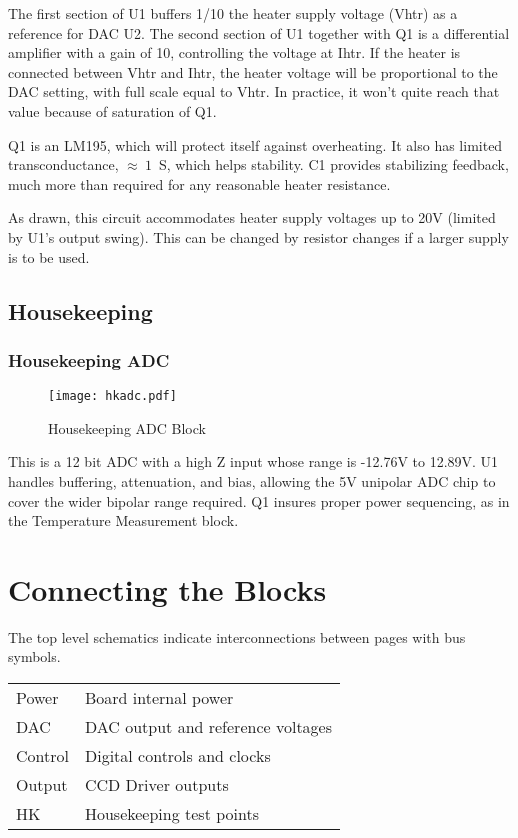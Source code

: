 \documentclass[a4paper,12pt]{article}
\begin{document}
The first section of U1 buffers 1/10 the heater supply voltage (Vhtr) as a reference for DAC U2. The second section of U1 together with Q1 is a differential amplifier with a gain of 10, controlling the voltage at Ihtr.  If the heater is connected between Vhtr and Ihtr, the heater voltage will be proportional to the DAC setting, with full scale equal to Vhtr. In practice, it won't quite reach that value because of saturation of Q1.

Q1 is an LM195, which will protect itself against overheating. It also has limited transconductance, $\approx\ 1$\ S, which helps stability. C1 provides stabilizing feedback, much more than required for any reasonable heater resistance.

As drawn, this circuit accommodates heater supply voltages up to 20V (limited by U1's output swing). This can be changed by resistor changes if a larger supply is to be used.

\subsection{Housekeeping}

\subsubsection{Housekeeping ADC}
   \begin{figure}
   \begin{center}
   \texttt{[image: hkadc.pdf]}
   \end{center}
   \caption{Housekeeping ADC Block}
   \end{figure}

This is a 12 bit ADC with a high Z input whose range is -12.76V to 12.89V. U1 handles buffering, attenuation, and bias, allowing the 5V unipolar ADC chip to cover the wider bipolar range required. Q1 insures proper power sequencing, as in the Temperature Measurement block.

\section{Connecting the Blocks}

The top level schematics indicate interconnections between pages with bus symbols.

\begin{tabular}{ll}
Power & Board internal power \\
DAC & DAC output and reference voltages \\
Control & Digital controls and clocks \\
Output & CCD Driver outputs \\
HK & Housekeeping test points \\
\end{tabular}
\end{document}

